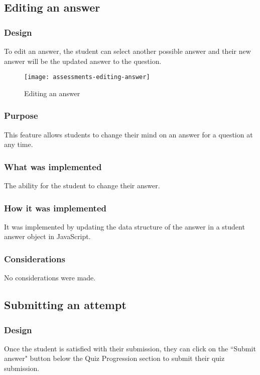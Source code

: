 \subsection{Editing an answer}

\subsubsection{Design}
To edit an answer, the student can select another possible answer and their new answer will be the updated answer to the question.

\begin{figure}[h!]
	\centering
	\texttt{[image: assessments-editing-answer]}
	\caption{Editing an answer}
\end{figure}

\subsubsection{Purpose}
This feature allows students to change their mind on an answer for a question at any time.

\subsubsection{What was implemented}
The ability for the student to change their answer.

\subsubsection{How it was implemented}
It was implemented by updating the data structure of the answer in a student answer object in JavaScript.

\subsubsection{Considerations}
No considerations were made.

\subsection{Submitting an attempt}

\subsubsection{Design}
Once the student is satisfied with their submission, they can click on the ``Submit answer" button below the Quiz Progression section to submit their quiz submission.

